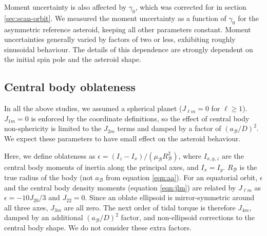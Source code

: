 \documentclass[fleqn,usenatbib]{mnras}
\begin{document}
Moment uncertainty is also affected by $\gamma_0$, which was corrected for in section \ref{sec:scan-orbit}. We measured the moment uncertainty as a function of $\gamma_0$ for the asymmetric reference asteroid, keeping all other parameters constant. Moment uncertainties generally varied by factors of two or less, exhibiting roughly sinusoidal behaviour. The details of this dependence are strongly dependent on the initial spin pole and the asteroid shape.

\subsection{Central body oblateness}
\label{sec:scan-oblateness}

In all the above studies, we assumed a spherical planet ($J_{\ell m} = 0$ for $\ell \geq 1$). $J_{1m} = 0$ is enforced by the coordinate definitions, so the effect of central body non-sphericity is limited to the $J_{2m}$ terms and damped by a factor of $(a_\mathcal{B} / D)^2$. We expect these parameters to have small effect on the asteroid behaviour.

Here, we define oblateness as $\epsilon = (I_z - I_x)/(\mu_\mathcal{B} R_\mathcal{B}^2)$, where $I_{x,y,z}$ are the central body moments of inertia along the principal axes, and $I_x = I_y$. $R_\mathcal{B}$ is the true radius of the body (not $a_\mathcal{B}$ from equation \ref{eqn:aa}). For an equatorial orbit, $\epsilon$ and the central body density moments (equation \ref{eqn:jlm}) are related by $J_{\ell m}$ as $\epsilon = -10J_{20}/3$ and $J_{22} = 0$. Since an oblate ellipsoid is mirror-symmetric around all three axes, $J_{3m}$ are all zero. The next order of tidal torque is therefore $J_{4m}$, damped by an additional $(a_\mathcal{B}/D)^2$ factor, and non-ellipsoid corrections to the central body shape. We do not consider these extra factors.
\end{document}
